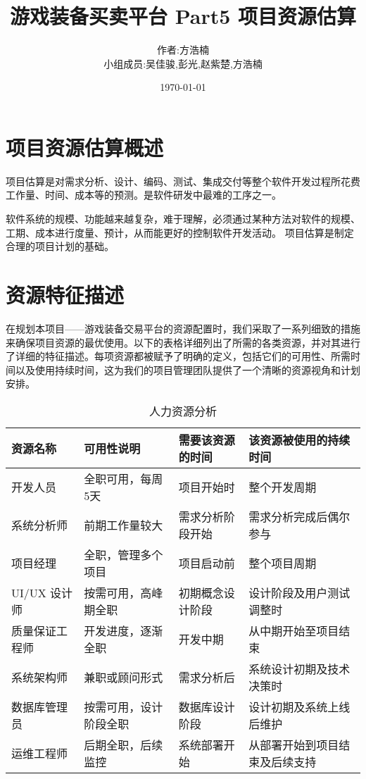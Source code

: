 \documentclass{ctexart}
\title{游戏装备买卖平台 Part5 项目资源估算}
\author{作者:方浩楠 \\ 小组成员:吴佳骏,彭光,赵紫楚,方浩楠}
\date{\today}
\begin{document}
\maketitle

\section{项目资源估算概述}

项目估算是对需求分析、设计、编码、测试、集成交付等整个软件开发过程所花费工作量、时间、成本等的预测。是软件研发中最难的工序之一。

软件系统的规模、功能越来越复杂，难于理解，必须通过某种方法对软件的规模、工期、成本进行度量、预计，从而能更好的控制软件开发活动。
项目估算是制定合理的项目计划的基础。

\section{资源特征描述}

在规划本项目——游戏装备交易平台的资源配置时，我们采取了一系列细致的措施来确保项目资源的最优使用。以下的表格详细列出了所需的各类资源，并对其进行了详细的特征描述。每项资源都被赋予了明确的定义，包括它们的可用性、所需时间以及使用持续时间，这为我们的项目管理团队提供了一个清晰的资源视角和计划安排。

\begin{table}[h!]
\centering
\begin{tabular}{@{}llll@{}}
\toprule
资源名称       & 可用性说明 & 需要该资源的时间 & 该资源被使用的持续时间 \\ \midrule
开发人员       & 全职可用，每周5天 & 项目开始时 & 整个开发周期 \\
系统分析师     & 前期工作量较大 & 需求分析阶段开始 & 需求分析完成后偶尔参与 \\
项目经理       & 全职，管理多个项目 & 项目启动前 & 整个项目周期 \\
UI/UX 设计师   & 按需可用，高峰期全职 & 初期概念设计阶段 & 设计阶段及用户测试调整时 \\
质量保证工程师 & 开发进度，逐渐全职 & 开发中期 & 从中期开始至项目结束 \\
系统架构师     & 兼职或顾问形式 & 需求分析后 & 系统设计初期及技术决策时 \\
数据库管理员   & 按需可用，设计阶段全职 & 数据库设计阶段 & 设计初期及系统上线后维护 \\
运维工程师     & 后期全职，后续监控 & 系统部署开始 & 从部署开始到项目结束及后续支持 \\ \bottomrule
\end{tabular}
\caption{人力资源分析}
\label{tab:my-table}
\end{table}
\end{document}
